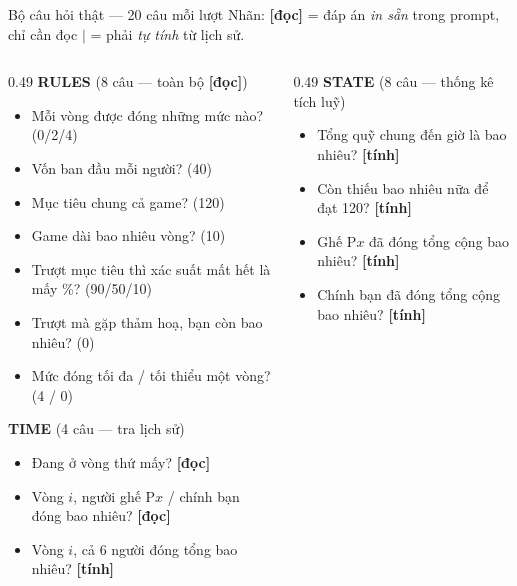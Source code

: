 \documentclass[aspectratio=169,11pt]{beamer}
\newcommand{\rd}{{\footnotesize\color{tealc}\textbf{[đọc]}}}
\newcommand{\sm}{{\footnotesize\color{coral}\textbf{[tính]}}}
\begin{document}
\begin{frame}{Bộ câu hỏi thật --- 20 câu mỗi lượt}
  {\footnotesize Nhãn: \rd{} = đáp án \emph{in sẵn} trong prompt, chỉ cần đọc \quad $\vert$ \quad \sm{} = phải \emph{tự tính} từ lịch sử.}
  \smallskip
  \begin{columns}[T]
    \begin{column}{0.49\textwidth}
      {\scriptsize\color{deepteal}\textbf{RULES} (8 câu --- toàn bộ \rd)}\par
      {\scriptsize
      \begin{itemize}\setlength\itemsep{1pt}
        \item Mỗi vòng được đóng những mức nào? \;(0/2/4)
        \item Vốn ban đầu mỗi người? \;(40)
        \item Mục tiêu chung cả game? \;(120)
        \item Game dài bao nhiêu vòng? \;(10)
        \item Trượt mục tiêu thì xác suất mất hết là mấy \%? \;(90/50/10)
        \item Trượt mà gặp thảm hoạ, bạn còn bao nhiêu? \;(0)
        \item Mức đóng tối đa / tối thiểu một vòng? \;(4 / 0)
      \end{itemize}}
      \smallskip
      {\scriptsize\color{deepteal}\textbf{TIME} (4 câu --- tra lịch sử)}\par
      {\scriptsize
      \begin{itemize}\setlength\itemsep{1pt}
        \item Đang ở vòng thứ mấy? \rd
        \item Vòng $i$, người ghế P$x$ / chính bạn đóng bao nhiêu? \rd
        \item Vòng $i$, cả 6 người đóng tổng bao nhiêu? \sm
      \end{itemize}}
    \end{column}
    \begin{column}{0.49\textwidth}
      {\scriptsize\color{deepteal}\textbf{STATE} (8 câu --- thống kê tích luỹ)}\par
      {\scriptsize
      \begin{itemize}\setlength\itemsep{1pt}
        \item Tổng quỹ chung đến giờ là bao nhiêu? \sm
        \item Còn thiếu bao nhiêu nữa để đạt 120? \sm
        \item Ghế P$x$ đã đóng tổng cộng bao nhiêu? \sm
        \item Chính bạn đã đóng tổng cộng bao nhiêu? \sm

\end{itemize}}
\end{column}
\end{columns}
\end{frame}
\end{document}
